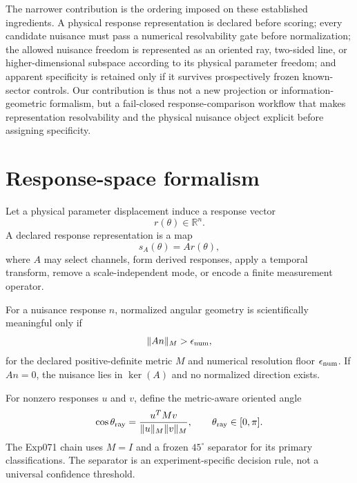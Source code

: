 \documentclass[11pt]{article}
\begin{document}
The narrower contribution is the ordering imposed on these established ingredients. A physical response representation is declared before scoring; every candidate nuisance must pass a numerical resolvability gate before normalization; the allowed nuisance freedom is represented as an oriented ray, two-sided line, or higher-dimensional subspace according to its physical parameter freedom; and apparent specificity is retained only if it survives prospectively frozen known-sector controls. Our contribution is thus not a new projection or information-geometric formalism, but a fail-closed response-comparison workflow that makes representation resolvability and the physical nuisance object explicit before assigning specificity.

\section{Response-space formalism}
Let a physical parameter displacement induce a response vector
\begin{equation}
r(\theta)\in\mathbb{R}^n.
\end{equation}
A declared response representation is a map
\begin{equation}
s_A(\theta)=A r(\theta),
\end{equation}
where $A$ may select channels, form derived responses, apply a temporal transform, remove a scale-independent mode, or encode a finite measurement operator.

For a nuisance response $n$, normalized angular geometry is scientifically meaningful only if
\begin{equation}
\|A n\|_M>\epsilon_{\rm num},
\end{equation}
for the declared positive-definite metric $M$ and numerical resolution floor $\epsilon_{\rm num}$. If $A n=0$, the nuisance lies in $\ker(A)$ and no normalized direction exists.

For nonzero responses $u$ and $v$, define the metric-aware oriented angle
\begin{equation}
\cos\theta_{\rm ray}=\frac{u^T M v}{\|u\|_M\|v\|_M},\qquad \theta_{\rm ray}\in[0,\pi].
\end{equation}
The Exp071 chain uses $M=I$ and a frozen $45^\circ$ separator for its primary classifications. The separator is an experiment-specific decision rule, not a universal confidence threshold.
\end{document}
